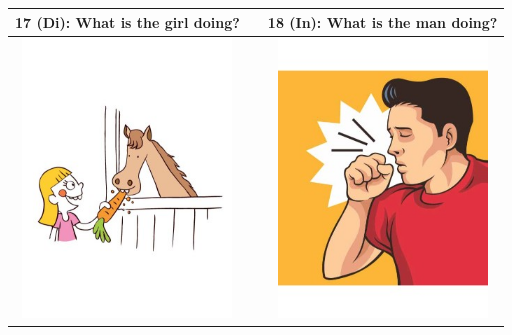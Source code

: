 \begin{tabular}{|c|c|c|}
\hline
17 (Di): What is the girl doing? && 18 (In): What is the man doing? \\
\hline
\includegraphics[width=15em,trim=0 0 0 -3]{figures/I17.jpg} & & \includegraphics[width=15em,trim=0 0 0 -3]{figures/I18.jpg} \\
\hline
\end{tabular}
\vspace{1em} \\


